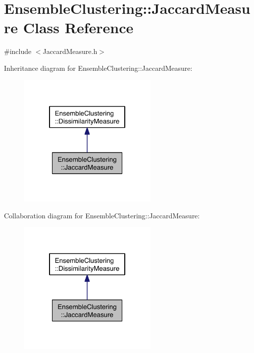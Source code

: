 \hypertarget{class_ensemble_clustering_1_1_jaccard_measure}{\section{Ensemble\-Clustering\-:\-:Jaccard\-Measure Class Reference}
\label{class_ensemble_clustering_1_1_jaccard_measure}
}


{\ttfamily \#include $<$Jaccard\-Measure.\-h$>$}



Inheritance diagram for Ensemble\-Clustering\-:\-:Jaccard\-Measure\-:
\nopagebreak
\begin{figure}[H]
\begin{center}
\leavevmode
\includegraphics[width=192pt]{class_ensemble_clustering_1_1_jaccard_measure__inherit__graph}
\end{center}
\end{figure}


Collaboration diagram for Ensemble\-Clustering\-:\-:Jaccard\-Measure\-:
\nopagebreak
\begin{figure}[H]
\begin{center}
\leavevmode
\includegraphics[width=192pt]{class_ensemble_clustering_1_1_jaccard_measure__coll__graph}
\end{center}
\end{figure}
